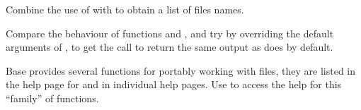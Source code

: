 \documentclass[krantz2]{krantz}\usepackage{knitr}%
\begin{document}
\begin{playground}
Combine the use of  with  to obtain a list of files names.
\end{playground}

\begin{playground}
Compare the behaviour of functions  and , and try by overriding the default arguments of , to get the call to return the same output as  does by default.
\end{playground}

Base \Rlang provides several functions for portably working with files, they are listed in the help page for  and in individual help pages. Use  to access the help for this ``family'' of functions.
\end{document}
